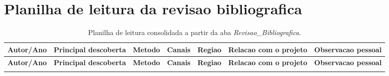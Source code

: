 \documentclass[12pt,oneside,a4paper,english,brazilian]{abntex2}
\begin{document}
\section{Planilha de leitura da revisao bibliografica}

\footnotesize
\setlength{\tabcolsep}{3pt}
\begin{longtable}{@{}>{\RaggedRight\arraybackslash}p{}>{\RaggedRight\arraybackslash}p{}>{\RaggedRight\arraybackslash}p{}>{\RaggedRight\arraybackslash}p{}>{\RaggedRight\arraybackslash}p{}>{\RaggedRight\arraybackslash}p{}>{\RaggedRight\arraybackslash}p{}@{}}
\caption{Planilha de leitura consolidada a partir da aba \textit{Revisao\_Bibliografica}.}\label{tab:planilha-biblio}\\
\toprule
\textbf{Autor/Ano} & \textbf{Principal descoberta} & \textbf{Metodo} & \textbf{Canais} & \textbf{Regiao} & \textbf{Relacao com o projeto} & \textbf{Observacao pessoal} \\
\midrule
\endfirsthead

\toprule
\textbf{Autor/Ano} & \textbf{Principal descoberta} & \textbf{Metodo} & \textbf{Canais} & \textbf{Regiao} & \textbf{Relacao com o projeto} & \textbf{Observacao pessoal} \\
\midrule
\endhead

\midrule
\endfoot

\bottomrule
\endlastfoot


\end{longtable}
\end{document}

